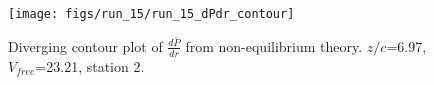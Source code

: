 \begin{figure}[H]
\centering
\texttt{[image: figs/run\_15/run\_15\_dPdr\_contour]}
\caption{Diverging contour plot of $\frac{d\bar{P}}{dr}$ from non-equilibrium theory. $z/c$=6.97, $V_{free}$=23.21, station 2.}
\label{fig:run_15_dPdr_contour}
\end{figure}


